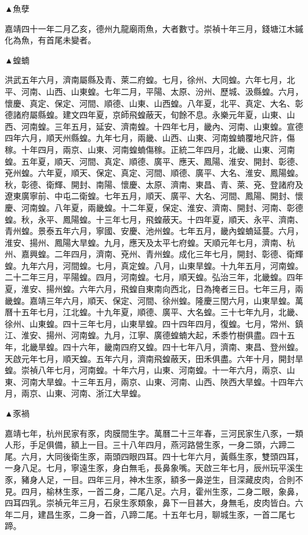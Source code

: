 \begin{pinyinscope}
▲魚孽

嘉靖四十一年二月乙亥，德州九龍廟雨魚，大者數寸。崇禎十年三月，錢塘江木鏚化為魚，有首尾未變者。

▲蝗蝻

洪武五年六月，濟南屬縣及青、萊二府蝗。七月，徐州、大同蝗。六年七月，北平、河南、山西、山東蝗。七年二月，平陽、太原、汾州、歷城、汲縣蝗。六月，懷慶、真定、保定、河間、順德、山東、山西蝗。八年夏，北平、真定、大名、彰德諸府屬縣蝗。建文四年夏，京師飛蝗蔽天，旬餘不息。永樂元年夏，山東、山西、河南蝗。三年五月，延安、濟南蝗。十四年七月，畿內、河南、山東蝗。宣德四年六月，順天州縣蝗。九年七月，兩畿、山西、山東、河南蝗蝻覆地尺許，傷稼。十年四月，兩京、山東、河南蝗蝻傷稼。正統二年四月，北畿、山東、河南蝗。五年夏，順天、河間、真定、順德、廣平、應天、鳳陽、淮安、開封、彰德、兗州蝗。六年夏，順天、保定、真定、河間、順德、廣平、大名、淮安、鳳陽蝗。秋，彰德、衛輝、開封、南陽、懷慶、太原、濟南、東昌、青、萊、兗、登諸府及遼東廣寧前、中屯二衛蝗。七年五月，順天、廣平、大名、河間、鳳陽、開封、懷慶、河南蝗。八年夏，兩畿蝗。十二年夏，保定、淮安、濟南、開封、河南、彰德蝗。秋，永平、鳳陽蝗。十三年七月，飛蝗蔽天。十四年夏，順天、永平、濟南、青州蝗。景泰五年六月，寧國、安慶、池州蝗。七年五月，畿內蝗蝻延蔓。六月，淮安、揚州、鳳陽大旱蝗。九月，應天及太平七府蝗。天順元年七月，濟南、杭州、嘉興蝗。二年四月，濟南、兗州、青州蝗。成化三年七月，開封、彰德、衛輝蝗。九年六月，河間蝗。七月，真定蝗。八月，山東旱蝗。十九年五月，河南蝗。二十二年三月，平陽蝗。四月，河南蝗。七月，順天蝗。弘治三年，北畿蝗。四年夏，淮安、揚州蝗。六年六月，飛蝗自東南向西北，日為掩者三日。七年三月，兩畿蝗。嘉靖三年六月，順天、保定、河間、徐州蝗。隆慶三閏六月，山東旱蝗。萬曆十五年七月，江北蝗。十九年夏，順德、廣平、大名蝗。三十七年九月，北畿、徐州、山東蝗。四十三年七月，山東旱蝗。四十四年四月，復蝗。七月，常州、鎮江、淮安、揚州、河南蝗。九月，江寧、廣德蝗蝻大起，禾黍竹樹俱盡。四十五年，北畿旱蝗。四十六年，畿南四府又蝗。四十七年八月，濟南、東昌、登州蝗。天啟元年七月，順天蝗。五年六月，濟南飛蝗蔽天，田禾俱盡。六年十月，開封旱蝗。崇禎八年七月，河南蝗。十年六月，山東、河南蝗。十一年六月，兩京、山東、河南大旱蝗。十三年五月，兩京、山東、河南、山西、陜西大旱蝗。十四年六月，兩京、山東、河南、浙江大旱蝗。

▲豕禍

嘉靖七年，杭州民家有豕，肉膜間生字。萬曆二十三年春，三河民家生八豕，一類人形，手足俱備，額上一目。三十八年四月，燕河路營生豕，一身二頭，六蹄二尾。六月，大同後衛生豕，兩頭四眼四耳。四十七年六月，黃縣生豕，雙頭四耳，一身八足。七月，寧遠生豕，身白無毛，長鼻象嘴。天啟三年七月，辰州玩平溪生豕，豬身人足，一目。四年三月，神木生豕，額多一鼻逆生，目深藏皮肉，合則不見。四月，榆林生豕，一首二身，二尾八足。六月，霍州生豕，二身二眼，象鼻，四耳四乳。崇禎元年三月，石泉生豕類象，鼻下一目甚大，身無毛，皮肉皆白。六年二月，建昌生豕，二身一首，八蹄二尾。十五年七月，聊城生豕，一首二尾七蹄。


\end{pinyinscope}
